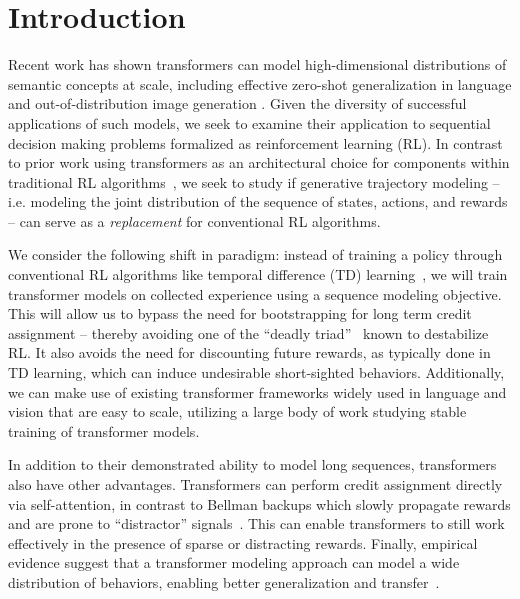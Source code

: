 
\section{Introduction}

Recent work has shown transformers \citep{vaswani2017attention} can model high-dimensional distributions of semantic concepts at scale, including effective zero-shot generalization in language \citep{brown2020gpt3} and out-of-distribution image generation \citep{ramesh2021dalle}.
Given the diversity of successful applications of such models, we seek to examine their application to sequential decision making problems formalized as reinforcement learning (RL).
In contrast to prior work using transformers as an architectural choice for components within traditional RL algorithms~\cite{parisotto2020stabilizing,zambaldi2018deep}, we seek to study if generative trajectory modeling -- i.e. modeling the joint distribution of the sequence of states, actions, and rewards -- can serve as a \emph{replacement} for conventional RL algorithms.

We consider the following shift in paradigm: instead of training a policy through conventional RL algorithms like temporal difference (TD) learning~\cite{sutton2018reinforcement}, we will train transformer models on collected experience using a sequence modeling objective.
This will allow us to bypass the need for bootstrapping for long term credit assignment -- thereby avoiding one of the ``deadly triad''~\citep{sutton2018reinforcement} known to destabilize RL.
It also avoids the need for discounting future rewards, as typically done in TD learning, which can induce undesirable short-sighted behaviors.
Additionally, we can make use of existing transformer frameworks widely used in language and vision that are easy to scale, utilizing a large body of work studying stable training of transformer models.

In addition to their demonstrated ability to model long sequences, transformers also have other advantages.
Transformers can perform credit assignment directly via self-attention, in contrast to Bellman backups which slowly propagate rewards and are prone to ``distractor'' signals~\citep{hung2019optimizing}.
This can enable transformers to still work effectively in the presence of sparse or distracting rewards.
Finally, empirical evidence suggest that a transformer modeling approach can model a wide distribution of behaviors, enabling better generalization and transfer~\citep{ramesh2021dalle}.

